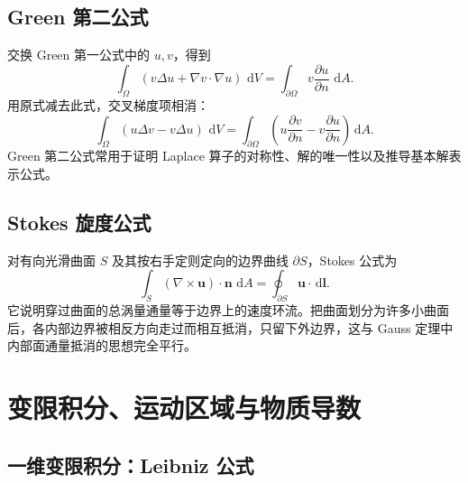 \documentclass[cn,hazy,blue,11pt,normal]{elegantnote}
\numberwithin{equation}{section}
\newcommand{\dd}{\,\mathrm d}
\newcommand{\vct}[1]{\bm{#1}}
\begin{document}
\subsection{Green 第二公式}

交换 Green 第一公式中的 $u,v$，得到
\begin{equation}
 \int_\Omega(v\Delta u+\nabla v\cdot\nabla u)\,\dd V
 =\int_{\partial\Omega}v\frac{\partial u}{\partial n}\,\dd A.
\end{equation}
用原式减去此式，交叉梯度项相消：
\begin{equation}
 \boxed{\int_\Omega(u\Delta v-v\Delta u)\,\dd V
 =\int_{\partial\Omega}
 \left(u\frac{\partial v}{\partial n}
 -v\frac{\partial u}{\partial n}\right)\dd A.} \label{eq:green-second}
\end{equation}
Green 第二公式常用于证明 Laplace 算子的对称性、解的唯一性以及推导基本解表示公式。

\subsection{Stokes 旋度公式}

对有向光滑曲面 $S$ 及其按右手定则定向的边界曲线 $\partial S$，Stokes 公式为
\begin{equation}
 \boxed{\int_S(\nabla\times\vct u)\cdot\vct n\,\dd A
 =\oint_{\partial S}\vct u\cdot\dd\vct l.} \label{eq:stokes}
\end{equation}
它说明穿过曲面的总涡量通量等于边界上的速度环流。把曲面划分为许多小曲面后，各内部边界被相反方向走过而相互抵消，只留下外边界，这与 Gauss 定理中内部面通量抵消的思想完全平行。





\section{变限积分、运动区域与物质导数}

\subsection{一维变限积分：Leibniz 公式}
\end{document}
